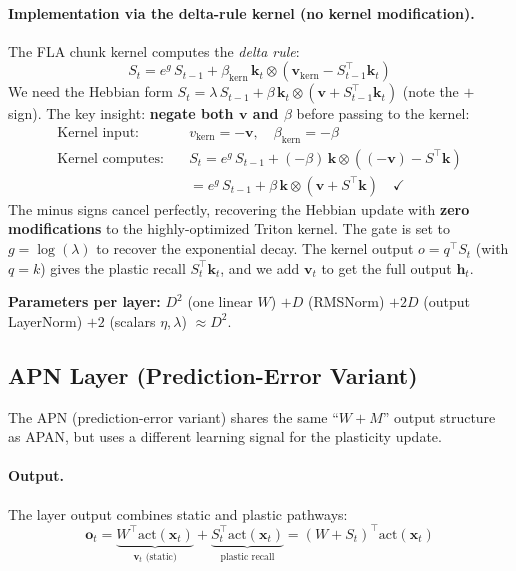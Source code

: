 \documentclass[11pt,a4paper]{article}
\begin{document}
\paragraph{Implementation via the delta-rule kernel (no kernel modification).}
The FLA chunk kernel computes the \emph{delta rule}:
\begin{equation}
S_t = e^g \, S_{t-1} + \beta_{\text{kern}} \, \mathbf{k}_t \otimes (\mathbf{v}_{\text{kern}} - S_{t-1}^\top \mathbf{k}_t)
\end{equation}
We need the Hebbian form $S_t = \lambda\, S_{t-1} + \beta\, \mathbf{k}_t \otimes (\mathbf{v} + S_{t-1}^\top \mathbf{k}_t)$ (note the $+$ sign).
The key insight: \textbf{negate both $\mathbf{v}$ and $\beta$} before passing to the kernel:
\begin{align}
\text{Kernel input:} \quad &v_{\text{kern}} = -\mathbf{v}, \quad \beta_{\text{kern}} = -\beta \\
\text{Kernel computes:} \quad &S_t = e^g\, S_{t-1} + (-\beta)\, \mathbf{k} \otimes ((-\mathbf{v}) - S^\top \mathbf{k}) \\
&= e^g\, S_{t-1} + \beta\, \mathbf{k} \otimes (\mathbf{v} + S^\top \mathbf{k}) \quad \checkmark
\end{align}
The minus signs cancel perfectly, recovering the Hebbian update with \textbf{zero modifications} to the highly-optimized Triton kernel.
The gate is set to $g = \log(\lambda)$ to recover the exponential decay.
The kernel output $o = q^\top S_t$ (with $q = k$) gives the plastic recall $S_t^\top \mathbf{k}_t$, and we add $\mathbf{v}_t$ to get the full output $\mathbf{h}_t$.

\textbf{Parameters per layer:} $D^2$ (one linear $W$) $+ D$ (RMSNorm) $+ 2D$ (output LayerNorm) $+ 2$ (scalars $\eta, \lambda$) $\approx D^2$.


\subsection{APN Layer (Prediction-Error Variant)}
\label{sec:apn}

The APN (prediction-error variant) shares the same ``$W + M$'' output structure as APAN, but uses a different learning signal for the plasticity update.

\paragraph{Output.}
The layer output combines static and plastic pathways:
\begin{equation}
\mathbf{o}_t = \underbrace{W^\top \text{act}(\mathbf{x}_t)}_{\mathbf{v}_t\text{ (static)}} + \underbrace{S_t^\top \text{act}(\mathbf{x}_t)}_{\text{plastic recall}} = (W + S_t)^\top \text{act}(\mathbf{x}_t)
\end{equation}
\end{document}
